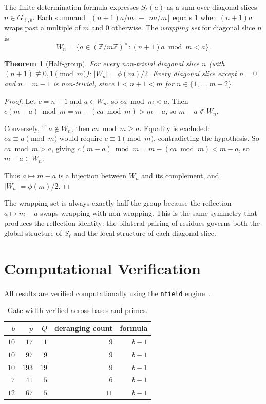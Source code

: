\documentclass[12pt]{amsart}
\newtheorem{theorem}{Theorem}
\theoremstyle{definition}
\theoremstyle{remark}
\begin{document}
The finite determination formula expresses $S_{\ell}(a)$ as
a sum over diagonal slices $n \in G_{\ell,b}$. Each summand
$\lfloor(n{+}1)a/m\rfloor - \lfloor na/m\rfloor$ equals
$1$ when $(n{+}1)a$ wraps past a multiple of $m$ and $0$
otherwise. The \emph{wrapping set} for diagonal slice $n$ is
\[
W_n = \{a \in (\mathbb{Z}/m\mathbb{Z})^{\times} :
(n{+}1)a \bmod m < a\}.
\]

\begin{theorem}[Half-group]\label{thm:half}
For every non-trivial diagonal slice $n$ (with
$(n{+}1) \not\equiv 0, 1 \pmod{m}$):
$|W_n| = \phi(m)/2$. Every diagonal slice except $n = 0$
and $n = m - 1$ is non-trivial, since $1 < n + 1 < m$
for $n \in \{1, \ldots, m{-}2\}$.
\end{theorem}

\begin{proof}
Let $c = n + 1$ and $a \in W_n$, so $ca \bmod m < a$.
Then $c(m{-}a) \bmod m = m - (ca \bmod m) > m - a$,
so $m - a \notin W_n$.

Conversely, if $a \notin W_n$, then $ca \bmod m \ge a$.
Equality is excluded: $ca \equiv a \pmod{m}$ would
require $c \equiv 1 \pmod{m}$, contradicting the
hypothesis. So $ca \bmod m > a$, giving
$c(m{-}a) \bmod m = m - (ca \bmod m) < m - a$,
so $m - a \in W_n$.

Thus $a \mapsto m - a$ is a bijection between $W_n$
and its complement, and $|W_n| = \phi(m)/2$.
\end{proof}

The wrapping set is always exactly half the group
because the reflection $a \mapsto m - a$ swaps wrapping
with non-wrapping. This is the same symmetry that
produces the reflection identity: the bilateral pairing
of residues governs both the global structure of
$S_{\ell}$ and the local structure of each diagonal slice.

\section{Computational Verification}

All results are verified computationally using the
\texttt{nfield} engine~\cite{nfield}.

\begin{table}[h]
\centering
\begin{tabular}{rrrrr}
\toprule
$b$ & $p$ & $Q$ & deranging count & formula \\
\midrule
$10$ & $17$ & $1$ & $9$ & $b - 1$ \\
$10$ & $97$ & $9$ & $9$ & $b - 1$ \\
$10$ & $193$ & $19$ & $9$ & $b - 1$ \\
$7$ & $41$ & $5$ & $6$ & $b - 1$ \\
$12$ & $67$ & $5$ & $11$ & $b - 1$ \\
\bottomrule
\end{tabular}
\caption{Gate width verified across bases and primes.}
\end{table}
\end{document}
